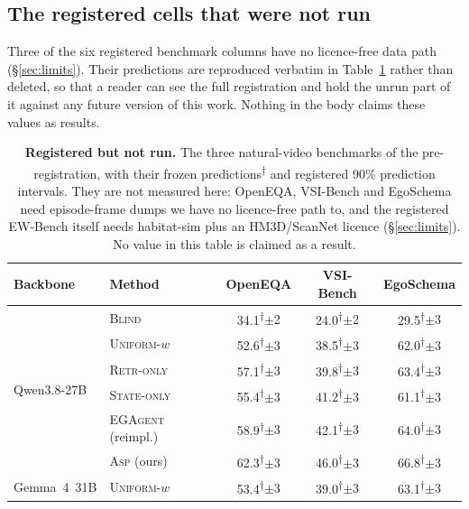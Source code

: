 \documentclass[10pt]{article}
\theoremstyle{definition}
\theoremstyle{plain}
\newcommand{\pred}{\textsuperscript{\textcolor{cpred}{$\dagger$}}}
\newcommand{\ASP}{\textsc{Asp}}
\begin{document}
\subsection{The registered cells that were not run}
Three of the six registered benchmark columns have no licence-free data path (\S\ref{sec:limits}). Their predictions are reproduced verbatim in Table~\ref{tab:registered} rather than deleted, so that a reader can see the full registration and hold the unrun part of it against any future version of this work. Nothing in the body claims these values as results.

\begin{table}[!t]
\centering\footnotesize\setlength{\tabcolsep}{5pt}
\caption{\textbf{Registered but not run.} The three natural-video benchmarks of the pre-registration, with their frozen predictions\pred{} and registered 90\% prediction intervals. They are not measured here: OpenEQA, VSI-Bench and EgoSchema need episode-frame dumps we have no licence-free path to, and the registered EW-Bench itself needs habitat-sim plus an HM3D/ScanNet licence (\S\ref{sec:limits}). No value in this table is claimed as a result.}
\label{tab:registered}
\begin{tabular}{llccc}
\toprule
Backbone & Method & OpenEQA & VSI-Bench & EgoSchema \\
\midrule
\multirow{6}{*}{Qwen3.8-27B}
 & \textsc{Blind} & 34.1\pred{\scriptsize$\pm$2} & 24.0\pred{\scriptsize$\pm$2} & 29.5\pred{\scriptsize$\pm$3} \\
 & \textsc{Uniform-}$w$ & 52.6\pred{\scriptsize$\pm$3} & 38.5\pred{\scriptsize$\pm$3} & 62.0\pred{\scriptsize$\pm$3} \\
 & \textsc{Retr-only} & 57.1\pred{\scriptsize$\pm$3} & 39.8\pred{\scriptsize$\pm$3} & 63.4\pred{\scriptsize$\pm$3} \\
 & \textsc{State-only} & 55.4\pred{\scriptsize$\pm$3} & 41.2\pred{\scriptsize$\pm$3} & 61.1\pred{\scriptsize$\pm$3} \\
 & \textsc{EGAgent} (reimpl.) & 58.9\pred{\scriptsize$\pm$3} & 42.1\pred{\scriptsize$\pm$3} & 64.0\pred{\scriptsize$\pm$3} \\
 & \ASP{} (ours) & 62.3\pred{\scriptsize$\pm$3} & 46.0\pred{\scriptsize$\pm$3} & 66.8\pred{\scriptsize$\pm$3} \\
\midrule
\multirow{2}{*}{Gemma~4~31B}
 & \textsc{Uniform-}$w$ & 53.4\pred{\scriptsize$\pm$3} & 39.0\pred{\scriptsize$\pm$3} & 63.1\pred{\scriptsize$\pm$3} \\

\end{tabular}
\end{table}
\end{document}

